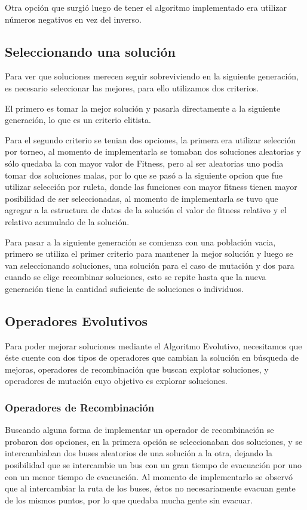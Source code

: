 \documentclass[letter, 10pt]{article}
\begin{document}
Otra opción que surgió luego de tener el algoritmo implementado era utilizar números negativos en vez del inverso.

\newpage
\subsection{Seleccionando una solución}
    Para ver que soluciones merecen seguir sobreviviendo en la siguiente generación, es necesario seleccionar las mejores, para ello utilizamos dos criterios.
    
    El primero es tomar la mejor solución y pasarla directamente a la siguiente generación, lo que es un criterio elitista.
    
    Para el segundo criterio se tenian dos opciones, la primera era utilizar selección por torneo, al momento de implementarla se tomaban dos soluciones aleatorias y sólo quedaba la con mayor valor de Fitness, pero al ser aleatorias uno podia tomar dos soluciones malas, por lo que se pasó a la siguiente opcion que fue utilizar selección por ruleta, donde las funciones con mayor fitness tienen mayor posibilidad de ser seleccionadas, al momento de implementarla se tuvo que agregar a la estructura de datos de la solución el valor de fitness relativo y el relativo acumulado de la solución. 
    
    Para pasar a la siguiente generación se comienza con una población vacia, primero se utiliza el primer criterio para mantener la mejor solución y luego se van seleccionando soluciones, una solución para el caso de mutación y dos para cuando se elige recombinar soluciones, esto se repite hasta que la nueva generación tiene la cantidad suficiente de soluciones o individuos.
    

\subsection{Operadores Evolutivos}
Para poder mejorar soluciones mediante el Algoritmo Evolutivo, necesitamos que éste cuente con dos tipos de operadores que cambian la solución en búsqueda de mejoras, operadores de recombinación que buscan explotar soluciones, y operadores de mutación cuyo objetivo es explorar soluciones.

\subsubsection{Operadores de Recombinación}
Buscando alguna forma de implementar un operador de recombinación se probaron dos opciones, en la primera opción se seleccionaban dos soluciones, y se intercambiaban dos buses aleatorios de una solución a la otra, dejando la posibilidad que se intercambie un bus con un gran tiempo de evacuación por uno con un menor tiempo de evacuación. Al momento de implementarlo se observó que al intercambiar la ruta de los buses, éstos no necesariamente evacuan gente de los mismos puntos, por lo que quedaba mucha gente sin evacuar.
\end{document}
